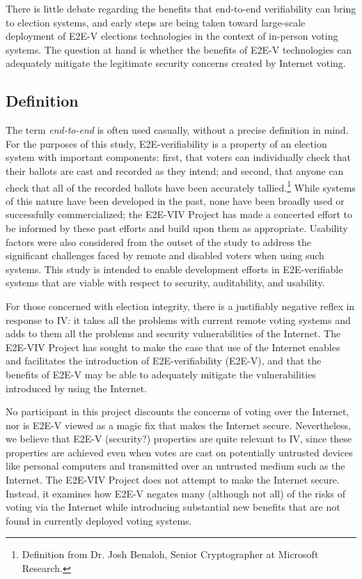 There is little debate regarding the benefits that end-to-end
verifiability can bring to election systems, and early steps are being
taken toward large-scale deployment of E2E-V elections technologies in
the context of in-person voting systems. The question at hand is
whether the benefits of E2E-V technologies can adequately mitigate the
legitimate security concerns created by Internet voting.

\subsection{Definition}
\label{sec:definition}

The term \emph{end-to-end} is often used casually, without a precise
definition in mind. For the purposes of this study, E2E-verifiability
is a property of an election system with important components: first,
that voters can individually check that their ballots are cast and
recorded as they intend; and second, that anyone can check that all of
the recorded ballots have been accurately tallied.\footnote{Definition
  from Dr. Josh Benaloh, Senior Cryptographer at Microsoft Research.}
While systems of this nature have been developed in the past, none
have been broadly used or successfully commercialized; the E2E-VIV
Project has made a concerted effort to be informed by these past
efforts and build upon them as appropriate. Usability factors were
also considered from the outset of the study to address the
significant challenges faced by remote and disabled voters when using
such systems. This study is intended to enable development efforts in
E2E-verifiable systems that are viable with respect to security,
auditability, and usability.

For those concerned with election integrity, there is a justifiably
negative reflex in response to IV: it takes all the problems with
current remote voting systems and adds to them all the problems and security
vulnerabilities of the Internet. The E2E-VIV Project has sought to
make the case that use of the Internet enables and facilitates the
introduction of E2E-verifiability (E2E-V), and that the benefits of
E2E-V may be able to adequately mitigate the vulnerabilities
introduced by using the Internet. 

No participant in this project
discounts the concerns of voting over the Internet, nor is E2E-V
viewed as a magic fix that makes the Internet secure. Nevertheless,
we believe that E2E-V (security?) properties are quite relevant to IV, since these
properties are achieved even when votes are cast on potentially
untrusted devices like personal computers and transmitted over an
untrusted medium such as the Internet. The E2E-VIV Project does not
attempt to make the Internet secure. Instead, it examines how E2E-V
negates many (although not all) of the risks of voting via the
Internet while introducing substantial new benefits that are not found
in currently deployed voting systems.

